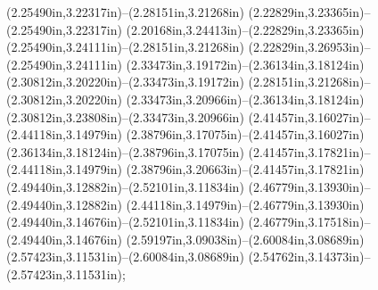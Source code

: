 (2.25490in,3.22317in)--(2.28151in,3.21268in) (2.22829in,3.23365in)--(2.25490in,3.22317in) (2.20168in,3.24413in)--(2.22829in,3.23365in) (2.25490in,3.24111in)--(2.28151in,3.21268in) (2.22829in,3.26953in)--(2.25490in,3.24111in) (2.33473in,3.19172in)--(2.36134in,3.18124in) (2.30812in,3.20220in)--(2.33473in,3.19172in) (2.28151in,3.21268in)--(2.30812in,3.20220in) (2.33473in,3.20966in)--(2.36134in,3.18124in) (2.30812in,3.23808in)--(2.33473in,3.20966in) (2.41457in,3.16027in)--(2.44118in,3.14979in) (2.38796in,3.17075in)--(2.41457in,3.16027in) (2.36134in,3.18124in)--(2.38796in,3.17075in) (2.41457in,3.17821in)--(2.44118in,3.14979in) (2.38796in,3.20663in)--(2.41457in,3.17821in) (2.49440in,3.12882in)--(2.52101in,3.11834in) (2.46779in,3.13930in)--(2.49440in,3.12882in) (2.44118in,3.14979in)--(2.46779in,3.13930in) (2.49440in,3.14676in)--(2.52101in,3.11834in) (2.46779in,3.17518in)--(2.49440in,3.14676in) (2.59197in,3.09038in)--(2.60084in,3.08689in) (2.57423in,3.11531in)--(2.60084in,3.08689in) (2.54762in,3.14373in)--(2.57423in,3.11531in);
